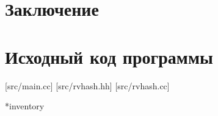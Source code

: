 \documentclass[variant=courcework]{bsuir}
\begin{document}






\chapter*{Заключение}



\chapter[обязательное]{Исходный код программы}

[src/main.cc]
[src/rvhash.hh]
[src/rvhash.cc]





*{inventory}
\end{document}
